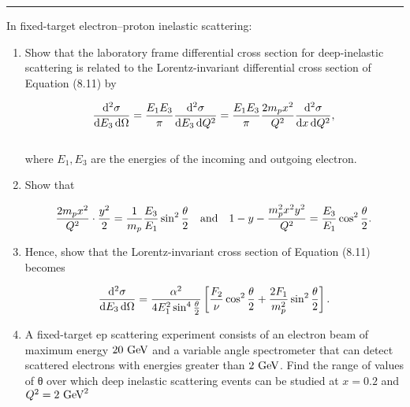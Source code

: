 \noindent\rule{7in}{1.5pt}


\begin{problem}{8.3}
    In fixed-target electron–proton inelastic scattering:
    \begin{enumerate}[label=(\alph*)]
        \item Show that the laboratory frame differential cross section for deep-inelastic scattering is related to the Lorentz-invariant differential cross section of Equation (8.11) by
        
        \begin{align*}
            \frac{\dif^2 \sigma}{\dif E_3 \dif \Omega} = \frac{E_1E_3}{\pi} \frac{\dif^2 \sigma}{\dif E_3 \dif Q^2} =  \frac{E_1E_3}{\pi} \frac{2m_px^2}{Q^2} \frac{\dif^2 \sigma}{\dif x \dif Q^2},
        \end{align*}\\
        where $E_1,E_3$ are the energies of the incoming and outgoing electron. 

        \item Show that
        
        \begin{align*}
            \frac{2m_p x^2}{Q^2} \cdot \frac{y^2}{2} = \frac{1}{m_p} \frac{E_3}{E_1} \sin^2 \frac{\theta}{2} \quad \text{and} \quad 1-y-\frac{m_p^2x^2y^2}{Q^2} = \frac{E_3}{E_1} \cos^2 \frac{\theta}{2}.
        \end{align*}

        \item Hence, show that the Lorentz-invariant cross section of Equation (8.11) becomes
        
        \begin{align*}
            \frac{\mathop{}\!\mathrm{d}^2 \sigma}{\mathop{}\!\mathrm{d} E_3 \mathop{}\!\mathrm{d} \Omega} = \frac{\alpha^2}{4E_1^2 \sin^4 \frac{\theta}{2}} \left[ \frac{F_2}{\nu}\cos^2\frac{\theta}{2} + \frac{2F_1}{m_p^2} \sin^2 \frac{\theta}{2} \right].
        \end{align*}

        \item A fixed-target ep scattering experiment consists of an electron beam of maximum energy $20 \text{ GeV}$ and a variable angle spectrometer that can detect scattered electrons with energies greater than $2 \text{ GeV}$. Find the range of values of θ over which deep inelastic scattering events can be studied at $x = 0.2$ and $Q^2 = 2 \text{ GeV}^2$
    \end{enumerate}
\end{problem}
\begin{solution}

\end{solution}

